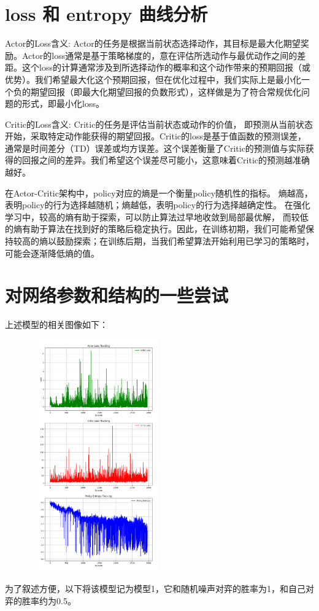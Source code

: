 \documentclass{ctexart}
\begin{document}
	\section{loss 和 entropy 曲线分析}
	Actor的Loss含义: Actor的任务是根据当前状态选择动作，其目标是最大化期望奖励。Actor的loss通常是基于策略梯度的，意在评估所选动作与最优动作之间的差距。这个loss的计算通常涉及到所选择动作的概率和这个动作带来的预期回报（或优势）。我们希望最大化这个预期回报，但在优化过程中，我们实际上是最小化一个负的期望回报（即最大化期望回报的负数形式），这样做是为了符合常规优化问题的形式，即最小化loss。

Critic的Loss含义: Critic的任务是评估当前状态或动作的价值，
即预测从当前状态开始，采取特定动作能获得的期望回报。Critic的loss是基于值函数的预测误差，通常是时间差分（TD）误差或均方误差。这个误差衡量了Critic的预测值与实际获得的回报之间的差异。我们希望这个误差尽可能小，这意味着Critic的预测越准确越好。

	在Actor-Critic架构中，policy对应的熵是一个衡量policy随机性的指标。
	熵越高，表明policy的行为选择越随机；熵越低，表明policy的行为选择越确定性。
	在强化学习中，较高的熵有助于探索，可以防止算法过早地收敛到局部最优解，
	而较低的熵有助于算法在找到好的策略后稳定执行。因此，在训练初期，我们可能希望保持较高的熵以鼓励探索；在训练后期，当我们希望算法开始利用已学习的策略时，可能会逐渐降低熵的值。
	
	

		
	\section{对网络参数和结构的一些尝试}
	上述模型的相关图像如下：
	\begin{figure}[H]
		\centering 
		\includegraphics[height=10cm,width=6cm]{5.png}
		\end{figure}
		为了叙述方便，以下将该模型记为模型1，它和随机噪声对弈的胜率为1，和自己对弈的胜率约为0.5。
	
\end{document}

